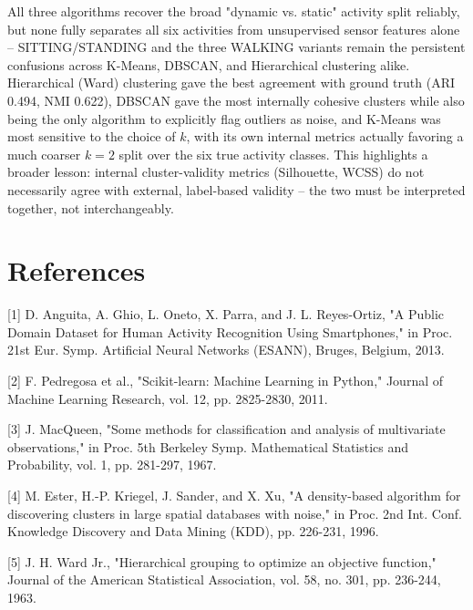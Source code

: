\documentclass[12pt,a4paper]{article}
\begin{document}
All three algorithms recover the broad "dynamic vs. static" activity
split reliably, but none fully separates all six activities from
unsupervised sensor features alone -- SITTING/STANDING and the three
WALKING variants remain the persistent confusions across K-Means,
DBSCAN, and Hierarchical clustering alike. Hierarchical (Ward) clustering
gave the best agreement with ground truth (ARI 0.494, NMI 0.622), DBSCAN
gave the most internally cohesive clusters while also being the only
algorithm to explicitly flag outliers as noise, and K-Means was most
sensitive to the choice of \(k\), with its own internal metrics actually
favoring a much coarser \(k=2\) split over the six true activity classes.
This highlights a broader lesson: internal cluster-validity metrics
(Silhouette, WCSS) do not necessarily agree with external, label-based
validity -- the two must be interpreted together, not interchangeably.

\section{References}
\label{sec:org16bfc01}

[1] D. Anguita, A. Ghio, L. Oneto, X. Parra, and J. L. Reyes-Ortiz, "A
Public Domain Dataset for Human Activity Recognition Using Smartphones,"
in Proc. 21st Eur. Symp. Artificial Neural Networks (ESANN), Bruges,
Belgium, 2013.

[2] F. Pedregosa et al., "Scikit-learn: Machine Learning in Python,"
Journal of Machine Learning Research, vol. 12, pp. 2825-2830, 2011.

[3] J. MacQueen, "Some methods for classification and analysis of
multivariate observations," in Proc. 5th Berkeley Symp. Mathematical
Statistics and Probability, vol. 1, pp. 281-297, 1967.

[4] M. Ester, H.-P. Kriegel, J. Sander, and X. Xu, "A density-based
algorithm for discovering clusters in large spatial databases with
noise," in Proc. 2nd Int. Conf. Knowledge Discovery and Data Mining
(KDD), pp. 226-231, 1996.

[5] J. H. Ward Jr., "Hierarchical grouping to optimize an objective
function," Journal of the American Statistical Association, vol. 58,
no. 301, pp. 236-244, 1963.
\end{document}
